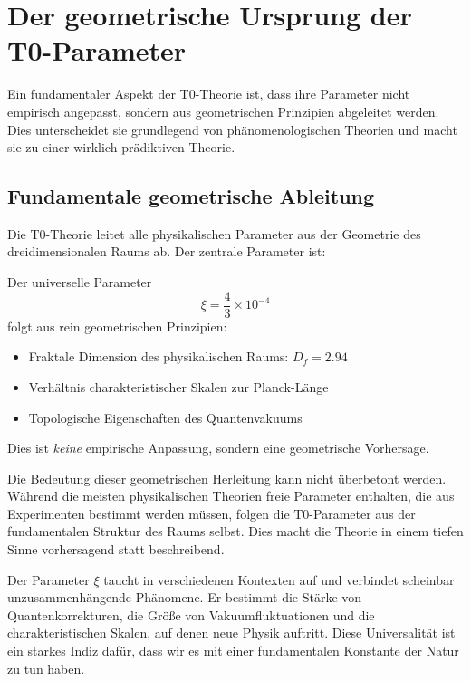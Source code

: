 \documentclass[12pt,a4paper]{article}
\begin{document}
	\section{Der geometrische Ursprung der T0-Parameter}
	
	Ein fundamentaler Aspekt der T0-Theorie ist, dass ihre Parameter nicht empirisch angepasst, sondern aus geometrischen Prinzipien abgeleitet werden. Dies unterscheidet sie grundlegend von phänomenologischen Theorien und macht sie zu einer wirklich prädiktiven Theorie.
	
	\subsection{Fundamentale geometrische Ableitung}
	
	Die T0-Theorie leitet alle physikalischen Parameter aus der Geometrie des dreidimensionalen Raums ab. Der zentrale Parameter ist:
	
	\begin{tcolorbox}[colback=t0blue!5!white, colframe=t0blue!75!black, title=T0-Vorhersage]
		Der universelle Parameter
		\begin{equation}
			\xi = \frac{4}{3} \times 10^{-4}
		\end{equation}
		folgt aus rein geometrischen Prinzipien:
		\begin{itemize}
			\item Fraktale Dimension des physikalischen Raums: $D_f = 2.94$
			\item Verhältnis charakteristischer Skalen zur Planck-Länge
			\item Topologische Eigenschaften des Quantenvakuums
		\end{itemize}
		Dies ist \emph{keine} empirische Anpassung, sondern eine geometrische Vorhersage.
	\end{tcolorbox}
	
	Die Bedeutung dieser geometrischen Herleitung kann nicht überbetont werden. Während die meisten physikalischen Theorien freie Parameter enthalten, die aus Experimenten bestimmt werden müssen, folgen die T0-Parameter aus der fundamentalen Struktur des Raums selbst. Dies macht die Theorie in einem tiefen Sinne vorhersagend statt beschreibend.
	
	Der Parameter $\xi$ taucht in verschiedenen Kontexten auf und verbindet scheinbar unzusammenhängende Phänomene. Er bestimmt die Stärke von Quantenkorrekturen, die Größe von Vakuumfluktuationen und die charakteristischen Skalen, auf denen neue Physik auftritt. Diese Universalität ist ein starkes Indiz dafür, dass wir es mit einer fundamentalen Konstante der Natur zu tun haben.
	
\end{document}
